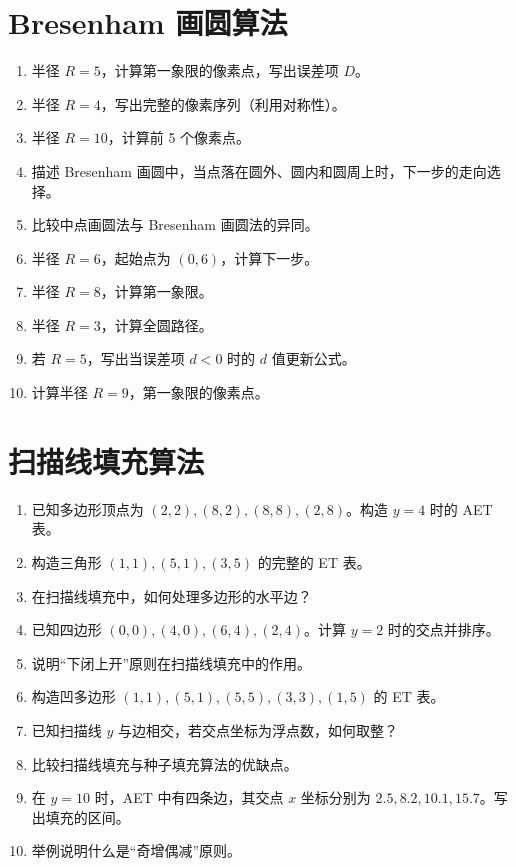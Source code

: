 \documentclass[UTF8]{ctexart}
\begin{document}
\section{Bresenham 画圆算法}
\begin{enumerate}
    \item 半径 $R=5$，计算第一象限的像素点，写出误差项 $D$。
    \item 半径 $R=4$，写出完整的像素序列（利用对称性）。
    \item 半径 $R=10$，计算前 5 个像素点。
    \item 描述 Bresenham 画圆中，当点落在圆外、圆内和圆周上时，下一步的走向选择。
    \item 比较中点画圆法与 Bresenham 画圆法的异同。
    \item 半径 $R=6$，起始点为 $(0,6)$，计算下一步。
    \item 半径 $R=8$，计算第一象限。
    \item 半径 $R=3$，计算全圆路径。
    \item 若 $R=5$，写出当误差项 $d < 0$ 时的 $d$ 值更新公式。
    \item 计算半径 $R=9$，第一象限的像素点。
\end{enumerate}

\section{扫描线填充算法}
\begin{enumerate}
    \item 已知多边形顶点为 $(2,2), (8,2), (8,8), (2,8)$。构造 $y=4$ 时的 AET 表。
    \item 构造三角形 $(1,1), (5,1), (3,5)$ 的完整的 ET 表。
    \item 在扫描线填充中，如何处理多边形的水平边？
    \item 已知四边形 $(0,0), (4,0), (6,4), (2,4)$。计算 $y=2$ 时的交点并排序。
    \item 说明“下闭上开”原则在扫描线填充中的作用。
    \item 构造凹多边形 $(1,1), (5,1), (5,5), (3,3), (1,5)$ 的 ET 表。
    \item 已知扫描线 $y$ 与边相交，若交点坐标为浮点数，如何取整？
    \item 比较扫描线填充与种子填充算法的优缺点。
    \item 在 $y=10$ 时，AET 中有四条边，其交点 $x$ 坐标分别为 $2.5, 8.2, 10.1, 15.7$。写出填充的区间。
    \item 举例说明什么是“奇增偶减”原则。
\end{enumerate}
\end{document}
